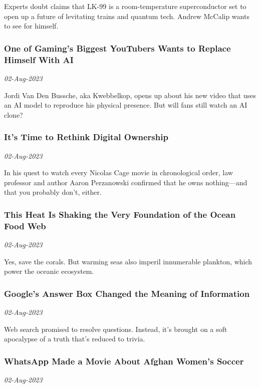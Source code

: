 Experts doubt claims that LK-99 is a room-temperature superconductor set to open up a future of levitating trains and quantum tech. Andrew McCalip wants to see for himself.
\subsubsection{One of Gaming’s Biggest YouTubers Wants to Replace Himself With AI \href{https://www.wired.com/story/kwebbelkop-youtube-ai-clone/}{}}
\textit{02-Aug-2023}

Jordi Van Den Bussche, aka Kwebbelkop, opens up about his new video that uses an AI model to reproduce his physical presence. But will fans still watch an AI clone?
\subsubsection{It’s Time to Rethink Digital Ownership \href{https://www.wired.com/story/have-a-nice-future-podcast-16/}{}}
\textit{02-Aug-2023}

In his quest to watch every Nicolas Cage movie in chronological order, law professor and author Aaron Perzanowski confirmed that he owns nothing—and that you probably don’t, either.
\subsubsection{This Heat Is Shaking the Very Foundation of the Ocean Food Web \href{https://www.wired.com/story/this-heat-is-shaking-the-very-foundation-of-the-ocean-food-web/}{}}
\textit{02-Aug-2023}

Yes, save the corals. But warming seas also imperil innumerable plankton, which power the oceanic ecosystem.
\subsubsection{Google's Answer Box Changed the Meaning of Information \href{https://www.wired.com/story/google-answer-box-information-search/}{}}
\textit{02-Aug-2023}

Web search promised to resolve questions. Instead, it's brought on a soft apocalypse of a truth that's reduced to trivia.
\subsubsection{WhatsApp Made a Movie About Afghan Women's Soccer \href{https://www.wired.com/story/whatsapp-encryption-afghanistan-women-soccer-movie/}{}}
\textit{02-Aug-2023}

